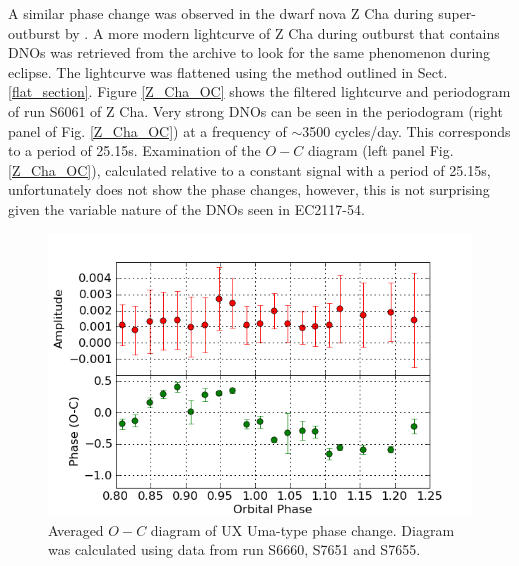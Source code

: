 A similar phase change was observed in the dwarf nova Z Cha during super-outburst by \cite{warner_brickhill}. A more modern lightcurve of Z Cha during outburst that contains DNOs was retrieved from the archive to look for the same phenomenon during eclipse. The lightcurve was flattened using the method outlined in Sect. \ref{flat_section}. Figure \ref{Z_Cha_OC} shows the filtered lightcurve and periodogram of run S6061 of Z Cha. Very strong DNOs can be seen in the periodogram (right panel of Fig. \ref{Z_Cha_OC}) at a frequency of $\sim$3500 cycles/day. This corresponds to a period of 25.15s. Examination of the $O-C$ diagram (left panel Fig. \ref{Z_Cha_OC}), calculated relative to a constant signal with a period of 25.15s, unfortunately does not show the phase changes, however, this is not surprising given the variable nature of the DNOs seen in EC2117-54.


\begin{figure}
 \centering
 \includegraphics[width=0.7\columnwidth,bb=0 0 600 400]{images/averaged_OC/fixed_may2008/ux_uma_type/average_OC.png}
 \caption[Averaged $O-C$ diagram of UX Uma-type phase change.]{Averaged $O-C$ diagram of UX Uma-type phase change. Diagram was calculated using data from run S6660, S7651 and S7655.}
 \label{fig:ux_uma_OC}
\end{figure}



